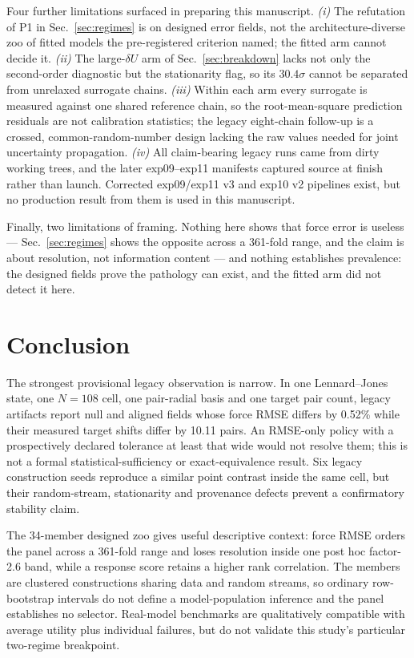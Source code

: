 \documentclass[aip,jcp,reprint,amsmath,amssymb,floatfix]{revtex4-2}
\newcommand{\dU}{\ensuremath{\delta U}}
\begin{document}
Four further limitations surfaced in preparing this manuscript. \emph{(i)} The
refutation of P1 in Sec.~\ref{sec:regimes} is on designed error
fields, not the architecture-diverse zoo of fitted models the pre-registered
criterion named; the fitted arm cannot decide it. \emph{(ii)} The large-$\dU$
arm of Sec.~\ref{sec:breakdown} lacks not only the second-order diagnostic but
the stationarity flag, so its $30.4\sigma$ cannot be separated from unrelaxed
surrogate chains. \emph{(iii)} Within each arm every surrogate is
measured against one shared reference chain, so the root-mean-square prediction
residuals are not calibration statistics; the legacy eight-chain follow-up is a
crossed, common-random-number design lacking the raw values needed for joint
uncertainty propagation. \emph{(iv)} All claim-bearing legacy runs came from
dirty working trees, and the later exp09--exp11 manifests captured source at
finish rather than launch. Corrected exp09/exp11 v3 and exp10 v2 pipelines
exist, but no production result from them is used in this manuscript.

Finally, two limitations of framing. Nothing here shows
that force error is useless --- Sec.~\ref{sec:regimes} shows the opposite across
a 361-fold range, and the claim is about resolution, not information content ---
and nothing establishes prevalence: the designed fields prove the
pathology can exist, and the fitted arm did not detect it here.

\section{Conclusion}
\label{sec:conclusion}

The strongest provisional legacy observation is narrow. In one Lennard--Jones
state, one $N=108$ cell, one pair-radial basis and one target pair count, legacy
artifacts report null and aligned fields whose force RMSE differs by 0.52\% while
their measured target shifts differ by 10.11 pairs. An RMSE-only policy with a
prospectively declared tolerance at least that wide would not resolve them;
this is not a formal statistical-sufficiency or exact-equivalence result. Six
legacy construction seeds reproduce a
similar point contrast inside the same cell, but their random-stream,
stationarity and provenance defects prevent a confirmatory stability claim.

The 34-member designed zoo gives useful descriptive context: force RMSE orders
the panel across a 361-fold range and loses resolution inside one post hoc
factor-2.6 band, while a response score retains a higher rank correlation. The
members are clustered constructions sharing data and random streams, so
ordinary row-bootstrap intervals do not define a model-population inference and
the panel establishes no selector. Real-model benchmarks are qualitatively
compatible with average utility plus individual failures, but do not validate
this study's particular two-regime breakpoint.
\end{document}
